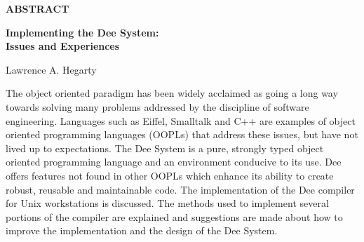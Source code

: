\setcounter{page}{3}
\vspace*{1cm}
\begin{center}
{\bf ABSTRACT}
\end{center}
\begin{center}
{\bf Implementing the Dee System:}\\
{\bf Issues and Experiences}
\end{center}
\vspace*{0.2in}
\begin{center}
Lawrence A. Hegarty
\end{center}


The object oriented paradigm has been widely acclaimed as going a long
way towards solving many problems addressed by the discipline of
software engineering.  Languages such as Eiffel, Smalltalk and C++ are
examples of object oriented programming languages (OOPLs) that address
these issues, but have not lived up to expectations.  The Dee System
is a pure, strongly typed object oriented programming language and an
environment conducive to its use.  Dee offers features not found in
other OOPLs which enhance its ability to create robust, reusable and
maintainable code.  The implementation of the Dee compiler for Unix
workstations is discussed.  The methods used to implement several
portions of the compiler are explained and suggestions are made about
how to improve the implementation and the design of the Dee System.


